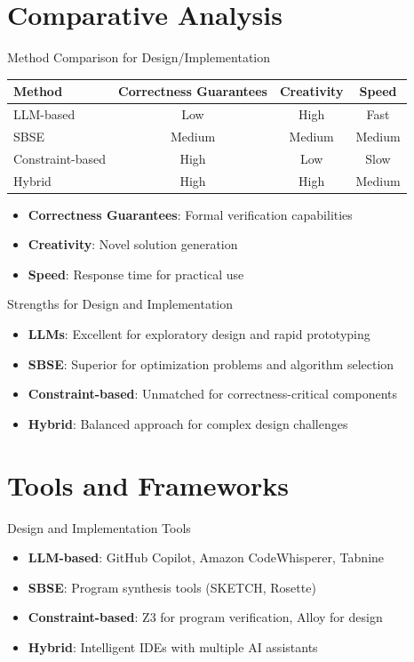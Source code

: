 \documentclass{beamer}
\begin{document}
\section{Comparative Analysis}
\begin{frame}[t]{Method Comparison for Design/Implementation}
\begin{center}
\begin{tabular}{lccc}
\textbf{Method} & \textbf{Correctness Guarantees} & \textbf{Creativity} & \textbf{Speed} \\
\hline
LLM-based & Low & High & Fast \\
SBSE & Medium & Medium & Medium \\
Constraint-based & High & Low & Slow \\
Hybrid & High & High & Medium \\
\end{tabular}
\end{center}

\begin{itemize}
\item \textbf{Correctness Guarantees}: Formal verification capabilities
\item \textbf{Creativity}: Novel solution generation
\item \textbf{Speed}: Response time for practical use
\end{itemize}
\end{frame}

\begin{frame}[t]{Strengths for Design and Implementation}
\begin{itemize}
\item \textbf{LLMs}: Excellent for exploratory design and rapid prototyping
\item \textbf{SBSE}: Superior for optimization problems and algorithm selection
\item \textbf{Constraint-based}: Unmatched for correctness-critical components
\item \textbf{Hybrid}: Balanced approach for complex design challenges
\end{itemize}
\end{frame}

\section{Tools and Frameworks}
\begin{frame}[t]{Design and Implementation Tools}
\begin{itemize}
\item \textbf{LLM-based}: GitHub Copilot, Amazon CodeWhisperer, Tabnine
\item \textbf{SBSE}: Program synthesis tools (SKETCH, Rosette)
\item \textbf{Constraint-based}: Z3 for program verification, Alloy for design
\item \textbf{Hybrid}: Intelligent IDEs with multiple AI assistants
\end{itemize}
\end{frame}
\end{document}
